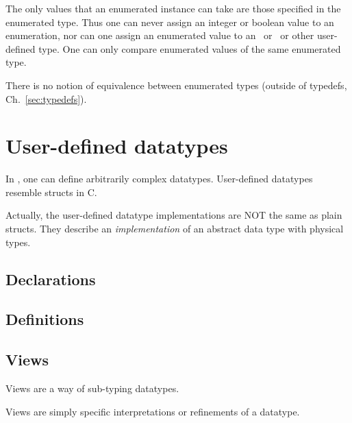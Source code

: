 The only values that an enumerated instance can take are 
those specified in the enumerated type.  
Thus one can never assign an integer or boolean value to an enumeration, 
nor can one assign an enumerated value to an \int\ or \bool\ or
other user-defined type.  
One can only compare enumerated values of the same enumerated type.  

There is no notion of equivalence between enumerated types 
(outside of typedefs, Ch.~\ref{sec:typedefs}).  

\section{User-defined datatypes}
\label{sec:datatype:userdef}

In \hac, one can define arbitrarily complex datatypes.  
User-defined datatypes resemble structs in C.  

Actually, the user-defined datatype implementations are
NOT the same as plain structs.  
They describe an \emph{implementation} of an abstract data type
with physical types.  

\subsection{Declarations}
\label{sec:datatype:userdef:declaration}

\subsection{Definitions}
\label{sec:datatype:userdef:definition}

\subsection{Views}
\label{sec:datatype:userdef:views}

Views are a way of sub-typing datatypes.  

Views are simply specific interpretations or refinements of a datatype.  




